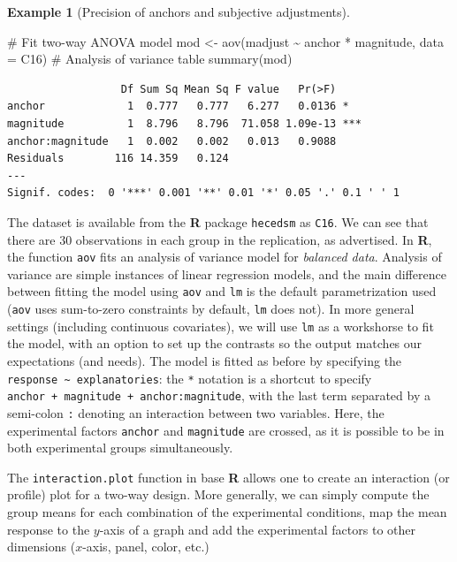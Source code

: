 \documentclass[
  11pt,
  letterpaper,
]{scrbook}
\newenvironment{Shaded}{\begin{snugshade}}{\end{snugshade}}
\newcommand{\AttributeTok}[1]{\textcolor[rgb]{0.40,0.45,0.13}{#1}}
\newcommand{\CommentTok}[1]{\textcolor[rgb]{0.37,0.37,0.37}{#1}}
\newcommand{\FunctionTok}[1]{\textcolor[rgb]{0.28,0.35,0.67}{#1}}
\newcommand{\NormalTok}[1]{\textcolor[rgb]{0.00,0.23,0.31}{#1}}
\newcommand{\OtherTok}[1]{\textcolor[rgb]{0.00,0.23,0.31}{#1}}
\newcommand{\SpecialCharTok}[1]{\textcolor[rgb]{0.37,0.37,0.37}{#1}}
\theoremstyle{definition}
\newtheorem{example}{Example}[chapter]
\theoremstyle{definition}
\theoremstyle{remark}
\begin{document}
\begin{example}[Precision of anchors and subjective
adjustments]
\begin{Shaded}
\begin{Highlighting}[]
\CommentTok{\# Fit two{-}way ANOVA model}
\NormalTok{mod }\OtherTok{\textless{}{-}} \FunctionTok{aov}\NormalTok{(madjust }\SpecialCharTok{\textasciitilde{}}\NormalTok{ anchor }\SpecialCharTok{*}\NormalTok{ magnitude,}
           \AttributeTok{data =}\NormalTok{ C16)}
\CommentTok{\# Analysis of variance table}
\FunctionTok{summary}\NormalTok{(mod)}
\end{Highlighting}
\end{Shaded}

\begin{verbatim}
                  Df Sum Sq Mean Sq F value   Pr(>F)    
anchor             1  0.777   0.777   6.277   0.0136 *  
magnitude          1  8.796   8.796  71.058 1.09e-13 ***
anchor:magnitude   1  0.002   0.002   0.013   0.9088    
Residuals        116 14.359   0.124                     
---
Signif. codes:  0 '***' 0.001 '**' 0.01 '*' 0.05 '.' 0.1 ' ' 1
\end{verbatim}

The dataset is available from the \textbf{R} package \texttt{hecedsm} as
\texttt{C16}. We can see that there are 30 observations in each group in
the replication, as advertised. In \textbf{R}, the function \texttt{aov}
fits an analysis of variance model for \emph{balanced data}. Analysis of
variance are simple instances of linear regression models, and the main
difference between fitting the model using \texttt{aov} and \texttt{lm}
is the default parametrization used (\texttt{aov} uses sum-to-zero
constraints by default, \texttt{lm} does not). In more general settings
(including continuous covariates), we will use \texttt{lm} as a
workshorse to fit the model, with an option to set up the contrasts so
the output matches our expectations (and needs). The model is fitted as
before by specifying the
\texttt{response\ \textasciitilde{}\ explanatories}: the \texttt{*}
notation is a shortcut to specify
\texttt{anchor\ +\ magnitude\ +\ anchor:magnitude}, with the last term
separated by a semi-colon \texttt{:} denoting an interaction between two
variables. Here, the experimental factors \texttt{anchor} and
\texttt{magnitude} are crossed, as it is possible to be in both
experimental groups simultaneously.

The \texttt{interaction.plot} function in base \textbf{R} allows one to
create an interaction (or profile) plot for a two-way design. More
generally, we can simply compute the group means for each combination of
the experimental conditions, map the mean response to the \(y\)-axis of
a graph and add the experimental factors to other dimensions
(\(x\)-axis, panel, color, etc.)


\end{example}
\end{document}
